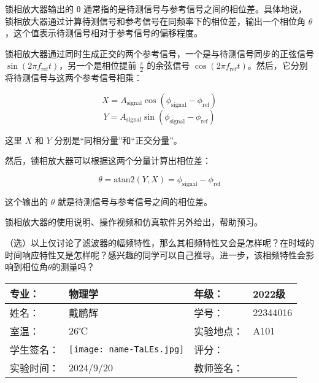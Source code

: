 \documentclass[dvipsnames, svgnames,a4paper,11pt]{article}
\begin{document}
锁相放大器输出的 θ 通常指的是待测信号与参考信号之间的相位差。具体地说，锁相放大器通过计算待测信号和参考信号在同频率下的相位差，输出一个相位角 \( \theta \)，这个值表示待测信号相对于参考信号的偏移程度。

锁相放大器通过同时生成正交的两个参考信号，一个是与待测信号同步的正弦信号 \( \sin(2\pi f_{\text{ref}} t) \)，另一个是相位提前 \( \frac{\pi}{2} \) 的余弦信号 \( \cos(2\pi f_{\text{ref}} t) \)。然后，它分别将待测信号与这两个参考信号相乘：

\[
X = A_{\text{signal}} \cos(\phi_{\text{signal}} - \phi_{\text{ref}})
\]
\[
Y = A_{\text{signal}} \sin(\phi_{\text{signal}} - \phi_{\text{ref}})
\]

这里 \( X \) 和 \( Y \) 分别是“同相分量”和“正交分量”。

然后，锁相放大器可以根据这两个分量计算出相位差：

\[
\theta = \text{atan2}(Y, X) = \phi_{\text{signal}} - \phi_{\text{ref}}
\]

这个输出的 \( \theta \) 就是待测信号与参考信号之间的相位差。




\begin{question}
	锁相放大器的使用说明、操作视频和仿真软件另外给出，帮助预习。
\end{question}





\begin{question}
	（选）以上仅讨论了滤波器的幅频特性，那么其相频特性又会是怎样呢？在时域的时间响应特性又是怎样呢？感兴趣的同学可以自己推导。进一步，该相频特性会影响到相位角$\theta$的测量吗？
\end{question}





\clearpage
\begin{table}
	\renewcommand\arraystretch{1.7}
	\centering
	\begin{tabularx}{\textwidth}{|X|X|X|X|}
	\hline
	专业：& 物理学 &年级：& 2022级 \\
	\hline
	姓名：& 戴鹏辉 & 学号：& 22344016 \\
	\hline
	室温：& 26℃ & 实验地点： & A101 \\
	\hline
	学生签名：& \texttt{[image: name-TaLEs.jpg]} & 评分： &\\
	\hline
	实验时间：& 2024/9/20 & 教师签名：&\\
	\hline
	\end{tabularx}
\end{table}
\end{document}
